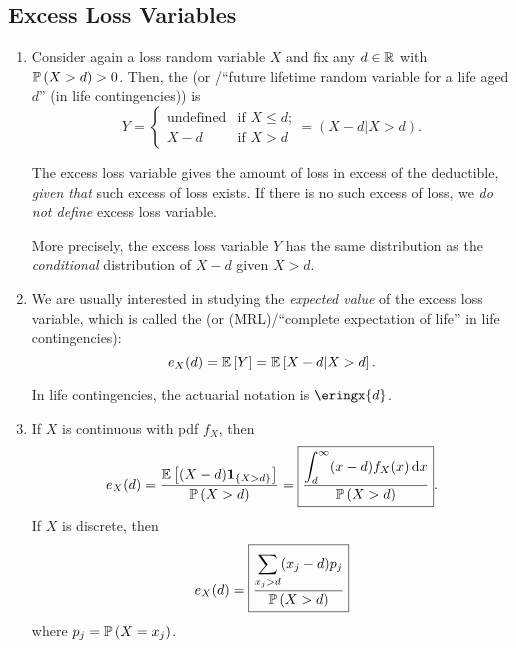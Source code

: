 \subsection{Excess Loss Variables}
\begin{enumerate}
\item Consider again a loss random variable \(X\) and fix any \(d\in\mathbb{R}\) with
\(\mathbb{P}\left(X>d\right)>0\). Then, the  (or /``future lifetime random variable for a life aged \(d\)'' (in life
contingencies)) is 
\[
Y=\begin{cases}
\text{undefined}&\text{if \(X\le d\);}\\
X-d&\text{if \(X>d\)}
\end{cases}
=(X-d|X>d).
\]
\begin{note}
The excess loss variable gives the amount of loss in excess of the deductible,
\emph{given that} such excess of loss exists. If there is no such excess of
loss, we \emph{do not define} excess loss variable.

More precisely, the excess loss variable \(Y\) has the same distribution as the
\emph{conditional} distribution of \(X-d\) given \(X>d\).
\end{note}
\item We are usually interested in studying the \emph{expected value} of the
excess loss variable, which is called the  (or
 (MRL)/``complete expectation of life'' in life
contingencies):
\[
e_{X}(d)=\mathbb{E}\left[Y\right]=\mathbb{E}\left[X-d|X>d\right].
\]
\begin{note}
In life contingencies, the actuarial notation is \(\eringx{d}\).
\end{note}
\item \label{it:mrl-fmlas}
If \(X\) is continuous with pdf \(f_X\), then
\[
e_X(d)=\frac{\mathbb{E}\left[(X-d)\mathbf{1}_{\left\{X>d\right\}}\right]}{\mathbb{P}\left(X>d\right)}
=\boxed{\frac{\displaystyle\int_{d}^{\infty}(x-d)f_X(x)\dd{x}}{\mathbb{P}\left(X>d\right)}}.
\]
If \(X\) is discrete, then
\[
e_X(d)=\boxed{\frac{\displaystyle \sum_{x_j>d}^{}(x_j-d)p_j}{\mathbb{P}\left(X>d\right)}}
\]
where \(p_j=\mathbb{P}\left(X=x_j\right)\).


\end{enumerate}
